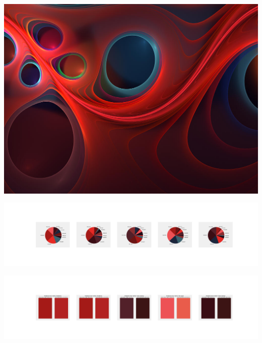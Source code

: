 \documentclass[11pt]{article}
\begin{document}
\begin{landscape}
    \begin{center}
    \includegraphics[width=\textwidth]{./nbimg/file (221).jpg}
    \end{center}

    \begin{center}
    \includegraphics[width=250mm]{./nbimg/pie-136.jpg}
    \end{center}

    \begin{center}
    \includegraphics[width=250mm]{./nbimg/peak-136.jpg}
    \end{center}
    


\end{landscape}
\end{document}
